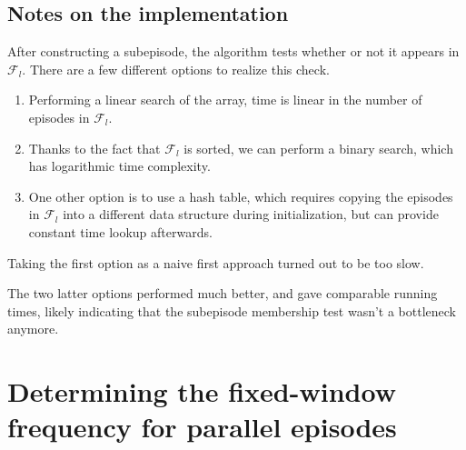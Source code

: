 \subsection{Notes on the implementation}

After constructing a subepisode, the algorithm tests whether or not it appears in $ \mathcal{F}_l $. There are a few different options to realize this check.

\begin{enumerate}
\item Performing a linear search of the array, time is linear in the number of episodes in $ \mathcal{F}_l $.
\item Thanks to the fact that $ \mathcal{F}_l $ is sorted, we can perform a binary search, which has logarithmic time complexity.
\item One other option is to use a hash table, which requires copying the episodes in $ \mathcal{F}_l $ into a different data structure during initialization, but can provide constant time lookup afterwards.
\end{enumerate}

Taking the first option as a naive first approach turned out to be too slow.

The two latter options performed much better, and gave comparable running times, likely indicating that the subepisode membership test wasn't a bottleneck anymore.


\section{Determining the fixed-window frequency for parallel episodes}
\label{sec:rec-par-fwi}

